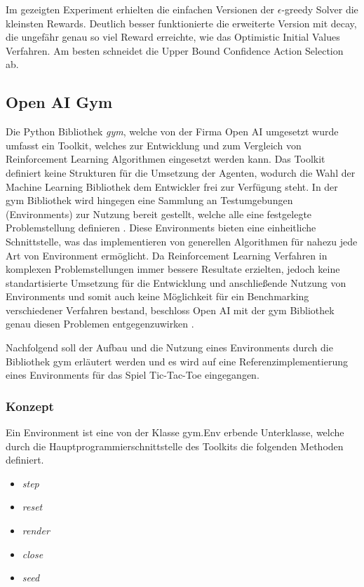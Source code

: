 \documentclass[11pt]{scrartcl}
\begin{document}
\noindent
Im gezeigten Experiment erhielten die einfachen Versionen der $\epsilon$-greedy Solver die
kleinsten Rewards. Deutlich besser funktionierte die erweiterte Version mit decay, die
ungefähr genau so viel Reward erreichte, wie das Optimistic Initial Values Verfahren. Am
besten schneidet die Upper Bound Confidence Action Selection ab.


\newpage
\subsection{Open AI Gym}
Die Python Bibliothek \textit{gym}, welche von der Firma Open AI umgesetzt wurde umfasst ein
Toolkit, welches zur Entwicklung und zum Vergleich von Reinforcement Learning Algorithmen
eingesetzt werden kann. Das Toolkit definiert keine Strukturen für die Umsetzung der Agenten,
wodurch die Wahl der Machine Learning Bibliothek dem Entwickler frei zur Verfügung steht. In
der gym Bibliothek wird hingegen eine Sammlung an Testumgebungen (Environments) zur Nutzung
bereit gestellt, welche alle eine festgelegte Problemstellung definieren \cite{OAI2016}. 
Diese Environments bieten eine einheitliche Schnittstelle, was das implementieren von
generellen Algorithmen für nahezu jede Art von Environment ermöglicht. Da Reinforcement
Learning Verfahren in komplexen Problemstellungen immer bessere Resultate erzielten, jedoch
keine standartisierte Umsetzung für die Entwicklung und anschließende Nutzung von Environments
und somit auch keine Möglichkeit für ein Benchmarking verschiedener Verfahren bestand,
beschloss Open AI mit der gym Bibliothek genau diesen Problemen entgegenzuwirken
\cite{OAI2016}.

Nachfolgend soll der Aufbau und die Nutzung eines Environments durch die Bibliothek gym
erläutert werden und es wird auf eine Referenzimplementierung eines Environments für das
Spiel Tic-Tac-Toe eingegangen.


\subsubsection{Konzept}
Ein Environment ist eine von der Klasse gym.Env erbende Unterklasse, welche durch die
Hauptprogrammierschnittstelle des Toolkits die folgenden Methoden definiert.

\begin{itemize}
\itemsep-6pt
\item \textit{step}
\item \textit{reset}
\item \textit{render}
\item \textit{close}
\item \textit{seed}
\end{itemize}  
\end{document}
